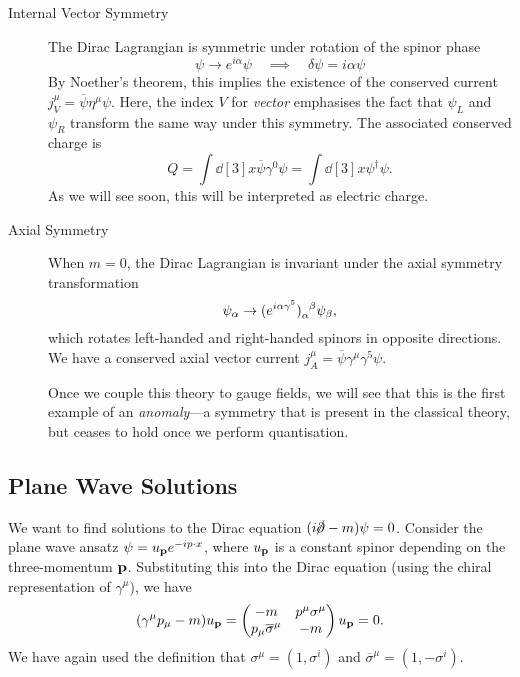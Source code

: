 \begin{description}
\begin{equation}
    \end{equation}
  \item[Internal Vector Symmetry]
    The Dirac Lagrangian is symmetric under rotation of the spinor phase
    \begin{equation}
      \psi \to e^{i\alpha} \psi \quad \implies \quad \delta \psi = i \alpha \psi
    \end{equation}
    By Noether's theorem, this implies the existence of the conserved current $j^{\mu}_V = \overline{\psi} \eta^{\mu} \psi$.
    Here, the index $V$ for \emph{vector} emphasises the fact that $\psi_L$ and $\psi_R$ transform the same way under this symmetry.
    The associated conserved charge is 
    \begin{equation}
      Q = \int \dd[3]{x} \overline{\psi} \gamma^0 \psi = \int \dd[3]{x} \psi^{\dagger} \psi.
    \end{equation}
    As we will see soon, this will be interpreted as electric charge.
  \item[Axial Symmetry]
    When $m = 0$, the Dirac Lagrangian is invariant under the axial symmetry transformation
    \begin{equation}
      \psi_{\alpha} \to (e^{i\alpha \gamma^5}) \indices{_{\alpha}^{\beta}} \psi_{\beta},
    \end{equation}
    which rotates left-handed and right-handed spinors in opposite directions. We have a conserved axial vector current $j^{\mu}_{A} = \overline{\psi} \gamma^{\mu} \gamma^5 \psi$.
    \begin{leftbar}
      \begin{remark}
	Once we couple this theory to gauge fields, we will see that this is the first example of an \emph{anomaly}---a symmetry that is present in the classical theory, but ceases to hold once we perform quantisation.
      \end{remark}
    \end{leftbar}
\end{description}

\subsection{Plane Wave Solutions}%
\label{sub:plane_wave_solutions}

We want to find solutions to the Dirac equation $(i \cancel{\partial} - m) \psi = 0$. Consider the plane wave ansatz $\psi = u_{\vb{p}} e^{-i p \cdot x}$, where $u_{\vb{p}}$ is a constant spinor depending on the three-momentum $\vb{p}$.
Substituting this into the Dirac equation (using the chiral representation of $\gamma^{\mu}$), we have
\begin{equation}
  \label{eq:16-star}
  (\gamma^{\mu} p_{\mu} - m) u_{\vb{p}} =  
  \begin{pmatrix}
   -m & p^{\mu}\sigma^{\mu} \\
   p_{\mu} \overline{\sigma}^{\mu} & -m \\
  \end{pmatrix}
  u_{\vb{p}} = 0.
\end{equation}
We have again used the definition that $\sigma^{\mu} = (1, \sigma^{i})$ and $\overline{\sigma}^{\mu} = (1, - \sigma^{i})$.

